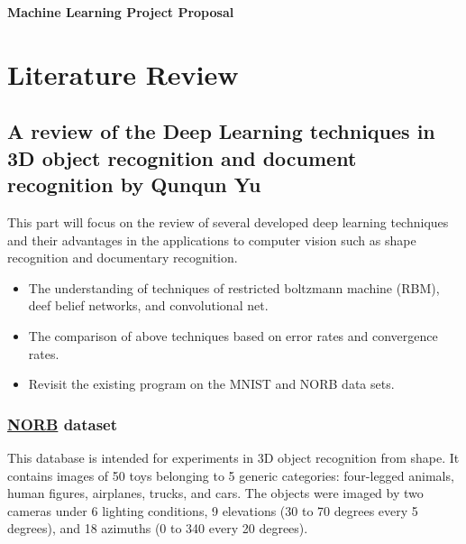 \documentclass[11pt]{article}
\numberwithin{equation}{section}
\numberwithin{equation}{section}
\newcommand{\0}{{\mathbf{0}}}
\newcommand{\1}{{\mathbf{1}}}
\begin{document}


\begin{title}
{\Large\bf Machine Learning Project Proposal
}
\end{title}
\author{Yanqian Wang and Qunqun Yu}
\date{October 2, 2015}
\maketitle


%
%
%
%

\section{Literature Review}
\subsection{ A review of the Deep Learning techniques in 3D object recognition and document recognition by Qunqun Yu}
This part will focus on the review of several developed deep learning techniques and their advantages in the applications to computer vision such as shape recognition and documentary recognition.
\begin{itemize}
\item The understanding of techniques of restricted boltzmann machine (RBM), deef belief networks, and convolutional net.
\item The comparison of above techniques based on error rates and convergence rates.
\item Revisit the existing program on the MNIST and NORB data sets.
\end{itemize}
\subsubsection{\href{http://www.cs.nyu.edu/~ylclab/data/norb-v1.0/}{NORB}  dataset}
This database is intended for experiments in 3D object recognition from shape. It contains images of 50 toys belonging to 5 generic categories: four-legged animals, human figures, airplanes, trucks, and cars. The objects were imaged by two cameras under 6 lighting conditions, 9 elevations (30 to 70 degrees every 5 degrees), and 18 azimuths (0 to 340 every 20 degrees).
\end{document}

